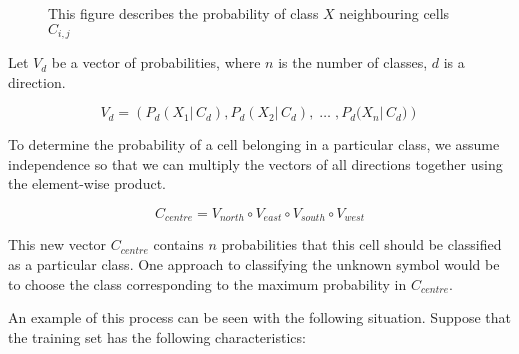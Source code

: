 \begin{figure}[h]
\begin{center}
\end{center}
\caption{This figure describes the probability of class $X$ neighbouring cells $C_{i,j}$}
\end{figure}


Let $V_{d}$ be a vector of probabilities, where $n$ is the number of classes,
$d$ is a direction.

\begin{equation}
V_{d} = \left(P_{d}{(X_{1} | \, C_{d})}, P_{d}{(X_{2} | \, C_{d}),\; \ldots \; , P_{d}{(X_{n} | \, C_{d}})}\right)
\end{equation}

To determine the probability of a cell belonging in a particular class, we assume independence
so that we can multiply the vectors of all directions together using the element-wise product.

\begin{equation}
C_{centre} = V_{north} \circ V_{east} \circ V_{south} \circ V_{west}
\end{equation}

This new vector $C_{centre}$ contains $n$ probabilities that this cell should be
classified as a particular class. One approach to classifying the unknown symbol
would be to choose the class corresponding to the maximum probability in $C_{centre}$.

An example of this process can be seen with the following situation. Suppose
that the training set has the following characteristics:

